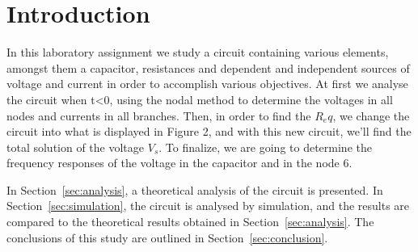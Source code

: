 \newpage
\section{Introduction}
\label{sec:introduction}

In this laboratory assignment we study a circuit containing various elements, amongst them a capacitor, resistances and dependent and independent sources of voltage and current in order to accomplish various objectives. At first we analyse the circuit when t<0, using the nodal method to determine the voltages in all nodes and currents in all branches. Then, in order to find the $R_eq$, we change the circuit into what is displayed in Figure 2, and with this new circuit, we'll find the total solution of the voltage $V_s$. To finalize, we are going to determine the frequency responses of the voltage in the capacitor and in the node 6. 



In Section~\ref{sec:analysis}, a theoretical analysis of the circuit is
presented. In Section~\ref{sec:simulation}, the circuit is analysed by
simulation, and the results are compared to the theoretical results obtained in
Section~\ref{sec:analysis}. The conclusions of this study are outlined in
Section~\ref{sec:conclusion}. \\

\pagebreak
